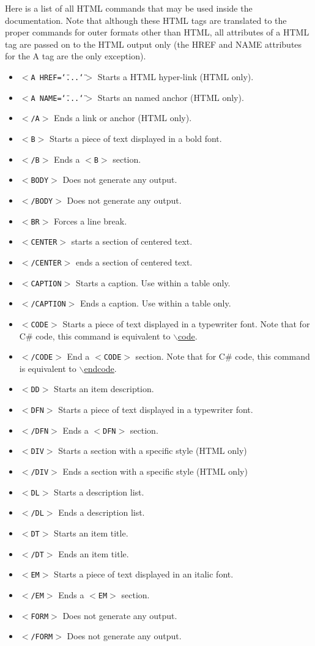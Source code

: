 Here is a list of all HTML commands that may be used inside the documentation. Note that although these HTML tags are translated to the proper commands for outer formats other than HTML, all attributes of a HTML tag are passed on to the HTML output only (the HREF and NAME attributes for the A tag are the only exception).

\begin{itemize}
\item {\tt $<$A HREF=\char`\"{}...\char`\"{}$>$} Starts a HTML hyper-link (HTML only). \item {\tt $<$A NAME=\char`\"{}...\char`\"{}$>$} Starts an named anchor (HTML only). \item {\tt $<$/A$>$} Ends a link or anchor (HTML only). \item {\tt $<$B$>$} Starts a piece of text displayed in a bold font. \item {\tt $<$/B$>$} Ends a {\tt $<$B$>$} section. \item {\tt $<$BODY$>$} Does not generate any output. \item {\tt $<$/BODY$>$} Does not generate any output. \item {\tt $<$BR$>$} Forces a line break. \item {\tt $<$CENTER$>$} starts a section of centered text. \item {\tt $<$/CENTER$>$} ends a section of centered text. \item {\tt $<$CAPTION$>$} Starts a caption. Use within a table only. \item {\tt $<$/CAPTION$>$} Ends a caption. Use within a table only. \item {\tt $<$CODE$>$} Starts a piece of text displayed in a typewriter font. Note that for C\# code, this command is equivalent to \hyperlink{commands_cmdcode}{$\backslash$code}. \item {\tt $<$/CODE$>$} End a {\tt $<$CODE$>$} section. Note that for C\# code, this command is equivalent to \hyperlink{commands_cmdendcode}{$\backslash$endcode}. \item {\tt $<$DD$>$} Starts an item description. \item {\tt $<$DFN$>$} Starts a piece of text displayed in a typewriter font. \item {\tt $<$/DFN$>$} Ends a {\tt $<$DFN$>$} section. \item {\tt $<$DIV$>$} Starts a section with a specific style (HTML only) \item {\tt $<$/DIV$>$} Ends a section with a specific style (HTML only) \item {\tt $<$DL$>$} Starts a description list. \item {\tt $<$/DL$>$} Ends a description list. \item {\tt $<$DT$>$} Starts an item title. \item {\tt $<$/DT$>$} Ends an item title. \item {\tt $<$EM$>$} Starts a piece of text displayed in an italic font. \item {\tt $<$/EM$>$} Ends a {\tt $<$EM$>$} section. \item {\tt $<$FORM$>$} Does not generate any output. \item {\tt $<$/FORM$>$} Does not generate any output. 
\end{itemize}
